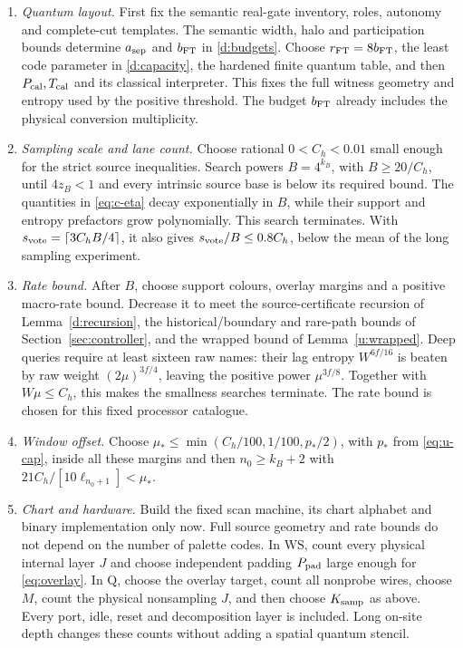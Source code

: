 \begin{enumerate}[label=\arabic*.]
\item \emph{Quantum layout.} First
fix the semantic real-gate inventory, roles, autonomy and complete-cut
templates. The semantic width, halo and participation bounds determine
\(a_{\rm sep}\) and \(b_{\rm FT}\) in \eqref{d:budgets}.
Choose \(r_{\rm FT}=8b_{\rm FT}\), the least code parameter
in \eqref{d:capacity}, the hardened finite quantum table, and then
\(P_{\rm cal},T_{\rm cal}\) and its classical interpreter.
This fixes the full witness geometry and entropy used by the positive
threshold. The budget \(b_{\rm FT}\) already includes the physical conversion multiplicity.

\item \emph{Sampling scale and lane count.} Choose rational \(0<C_h<0.01\) small enough for the strict source
inequalities. Search powers \(B=4^{k_B}\), with \(B\ge20/C_h\), until
\(4z_B<1\) and every intrinsic source base is below its required
bound. The quantities in \eqref{eq:c-eta} decay exponentially in
\(B\), while their support and entropy prefactors grow polynomially.
This search terminates. With \(s_{\rm vote}=\lceil3C_hB/4\rceil\), it also gives
\(s_{\rm vote}/B\le0.8C_h\), below the mean of the long sampling experiment.

\item \emph{Rate bound.} After \(B\), choose support colours, overlay margins and a positive
macro-rate bound. Decrease it to meet the source-certificate recursion
of Lemma~\ref{d:recursion}, the historical/boundary and rare-path
bounds of Section~\ref{sec:controller}, and the wrapped bound of
Lemma~\ref{u:wrapped}. Deep queries require at least sixteen raw names:
their lag entropy \(W^{6f/16}\) is beaten by raw weight
\((2\mu)^{3f/4}\), leaving the positive power \(\mu^{3f/8}\).
Together with \(W\mu\le C_h\), this makes the smallness searches
terminate. The rate bound is chosen for this fixed processor catalogue.

\item \emph{Window offset.} Choose \(\mu_*\le\min(C_h/100,1/100,p_*/2)\), with \(p_*\) from \eqref{eq:u-cap}, inside all these margins
and then \(n_0\ge k_B+2\) with
\(21C_h/[10\ell_{n_0+1}]<\mu_*\).
\item \emph{Chart and hardware.} Build the fixed scan machine,
its chart alphabet and binary implementation only now. Full source
geometry and rate bounds do not depend on the number of palette codes.
In \(\mathrm{WS}\), count every physical internal layer \(J\) and choose
independent padding \(P_{\rm pad}\) large enough for
\eqref{eq:overlay}. In \(\mathrm Q\), choose the overlay target,
count all nonprobe wires, choose \(M\), count the physical nonsampling
\(J\), and then choose \(K_{\rm samp}\) as above. Every port, idle,
reset and decomposition layer is included. Long on-site depth changes
these counts without adding a spatial quantum stencil.


\end{enumerate}
